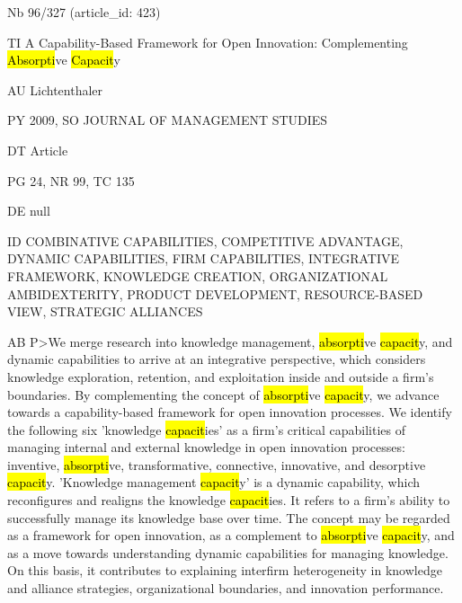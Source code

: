 \documentclass[a4paper]{article}
\begin{document}
\vspace*{-2cm}
Nb \tabto{0cm}96/327 (article\_id: 423)\par
TI \tabto{0cm}A Capability-Based Framework for Open Innovation: Complementing \hl{Absorpti}ve \hl{Capacit}y\par
AU \tabto{0cm}Lichtenthaler\par
PY \tabto{0cm}2009, SO JOURNAL OF MANAGEMENT STUDIES\par
DT \tabto{0cm}Article\par
PG \tabto{0cm}24, NR 99, TC 135\par
DE \tabto{0cm}null\par
ID \tabto{0cm}COMBINATIVE CAPABILITIES, COMPETITIVE ADVANTAGE, DYNAMIC CAPABILITIES, FIRM CAPABILITIES, INTEGRATIVE FRAMEWORK, KNOWLEDGE CREATION, ORGANIZATIONAL AMBIDEXTERITY, PRODUCT DEVELOPMENT, RESOURCE-BASED VIEW, STRATEGIC ALLIANCES\par
AB \tabto{0cm}P>We merge research into knowledge management, \hl{absorpti}ve \hl{capacit}y, and dynamic capabilities to arrive at an integrative perspective, which considers knowledge exploration, retention, and exploitation inside and outside a firm's boundaries. By complementing the concept of \hl{absorpti}ve \hl{capacit}y, we advance towards a capability-based framework for open innovation processes. We identify the following six 'knowledge \hl{capacit}ies' as a firm's critical capabilities of managing internal and external knowledge in open innovation processes: inventive, \hl{absorpti}ve, transformative, connective, innovative, and desorptive \hl{capacit}y. 'Knowledge management \hl{capacit}y' is a dynamic capability, which reconfigures and realigns the knowledge \hl{capacit}ies. It refers to a firm's ability to successfully manage its knowledge base over time. The concept may be regarded as a framework for open innovation, as a complement to \hl{absorpti}ve \hl{capacit}y, and as a move towards understanding dynamic capabilities for managing knowledge. On this basis, it contributes to explaining interfirm heterogeneity in knowledge and alliance strategies, organizational boundaries, and innovation performance.\par
\clearpage
\end{document}
